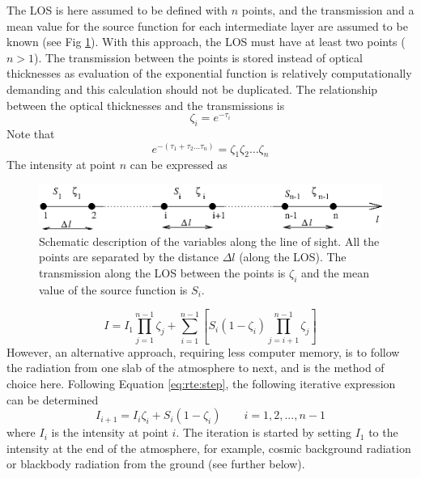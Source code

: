   
 \label{sec:rte:iter}
 
 The LOS is here assumed to be defined with $n$ points, and the
 transmission and a mean value for the source function for each
 intermediate layer are assumed to be known (see Fig
 \ref{fig:rte:los}). With this approach, the LOS must have at least two 
 points ($n>1$). 
 The transmission between the points is stored
 instead of optical thicknesses as evaluation of the exponential
 function is relatively computationally demanding and this calculation
 should not be duplicated. The relationship between
 the optical thicknesses and the transmissions is
 \begin{equation}
   \zeta_i = e^{-\tau_i}
 \end{equation}
 Note that
 \begin{equation}
   e^{-\left(\tau_1+\tau_2\dots\tau_n\right)}=\zeta_1\zeta_2\dots\zeta_n
 \end{equation}
 The intensity at point $n$ can be expressed as

  \begin{figure}[t]
    \includegraphics*[width=0.98\hsize]{Figs/los.eps}
    \caption{Schematic description of the variables along 
             the line of sight. All the points are separated by the distance
             $\Delta l$ (along the LOS). The transmission along the LOS
             between the points is $\zeta_i$ and the mean value of the source
             function is $S_i$.}  
    \label{fig:rte:los}  
  \end{figure}

 \begin{equation}
   I = I_1 \prod_{j=1}^{n-1}\zeta_j + 
       \sum_{i=1}^{n-1}\left[S_i(1-\zeta_i)\prod_{j=i+1}^{n-1}\zeta_j\right]
  \label{eq:rte:rteprod}
 \end{equation}
 However, an alternative approach, requiring less computer memory, is
 to follow the radiation from one slab of the atmosphere to next, and
 is the method of choice here. Following Equation \ref{eq:rte:step},
 the following iterative expression can be determined
 \citep{eriksson:97a}
 \begin{equation}
   I_{i+1} = I_i\zeta_i + S_i\left(1-\zeta_i\right)\qquad i=1,2,...,n\!\!-\!\!1
  \label{eq:rte:iteration}
 \end{equation}
 where $I_i$ is the intensity at point $i$.
 The iteration is started by setting $I_1$ to the intensity at the end
 of the atmosphere, for example, cosmic background radiation
 or blackbody radiation from the ground (see further below).

